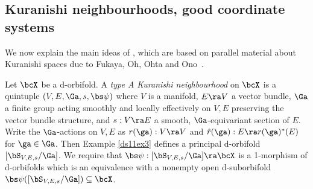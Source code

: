 \documentclass{article}
\begin{document}
\subsection[Kuranishi neighbourhoods and good coordinate
systems]{Kuranishi neighbourhoods, good coordinate systems}
\label{ds119}

We now explain the main ideas of \cite[\S 10.8]{Joyc6}, which are
based on parallel material about Kuranishi spaces
due to Fukaya, Oh, Ohta and Ono~\cite{FuOn,FOOO}.

\begin{dfn} Let $\bcX$ be a d-orbifold. A {\it type A Kuranishi
neighbourhood\/} on $\bcX$ is a quintuple $(V,E,\Ga,s,\bs\psi)$
where $V$ is a manifold, $E\ra V$ a vector bundle, $\Ga$ a finite
group acting smoothly and locally effectively on $V,E$ preserving
the vector bundle structure, and $s:V\ra E$ a smooth,
$\Ga$-equivariant section of $E$. Write the $\Ga$-actions on $V,E$
as $r(\ga):V\ra V$ and $\hat r(\ga):E\ra r(\ga)^*(E)$ for
$\ga\in\Ga$. Then Example \ref{ds11ex3} defines a principal
d-orbifold $[\bS_{V,E,s}/\Ga]$. We require that $\bs\psi:
[\bS_{V,E,s}/\Ga]\ra\bcX$ is a 1-morphism of d-orbifolds which is an
equivalence with a nonempty open d-suborbifold
$\bs\psi([\bS_{V,E,s}/\Ga])\subseteq\bcX$.
\label{ds11def5}
\end{dfn}
\end{document}
